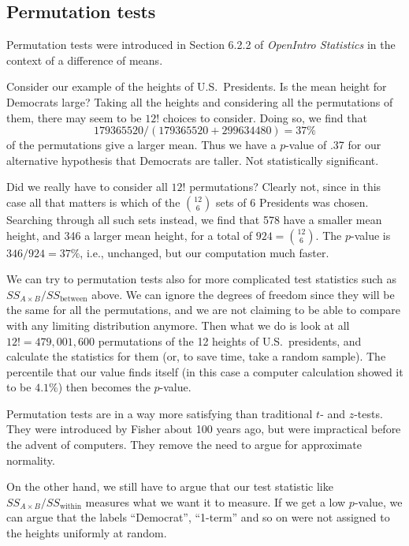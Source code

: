 \subsection{Permutation tests}%
Permutation tests were introduced in Section 6.2.2 of \emph{OpenIntro Statistics} in the context of a difference of means.

Consider our example of the heights of U.S.~Presidents. Is the mean height for Democrats large?
Taking all the heights and considering all the permutations of them, there may seem to be $12!$ choices to consider. Doing so, we find that 
\[
	179365520/(179365520+299634480) = 37\%
\]
of the permutations give a larger mean. Thus we have a $p$-value of .37 for our alternative hypothesis that Democrats are taller. Not statistically significant.

Did we really have to consider all $12!$ permutations? Clearly not, since in this case all that matters is which of the $12\choose 6$ sets of 6 Presidents was chosen. Searching through all such sets instead, we find that 578 have a smaller mean height, and 346 a larger mean height, for a total of $924={12\choose 6}$.
The $p$-value is $346/924 = 37\%$, i.e., unchanged, but our computation much faster.



We can try to permutation tests also for more complicated test statistics such as $SS_{A\times B}/SS_{\text{between}}$ above. We can ignore the degrees of freedom since they will be the same for all the permutations, and we are not claiming to be able to compare with any limiting distribution anymore. Then what we do is look at all $12!=479,001,600$ permutations of the 12 heights of U.S.~presidents, and calculate the statistics for them (or, to save time, take a random sample). The percentile that our value finds itself (in this case a computer calculation showed it to be $4.1\%$) then becomes the $p$-value.

Permutation tests are in a way more satisfying than traditional $t$- and $z$-tests. They were introduced by Fisher about 100 years ago, but were impractical before the advent of computers. They remove the need to argue for approximate normality.

On the other hand, we still have to argue that our test statistic like $SS_{A\times B}/SS_{\text{within}}$ measures what we want it to measure. If we get a low $p$-value, we can argue that the labels ``Democrat'', ``1-term'' and so on were not assigned to the heights uniformly at random.

